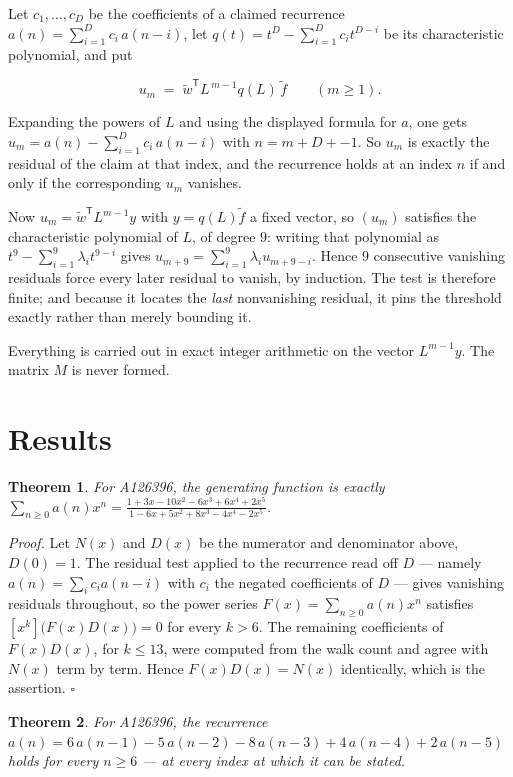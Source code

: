 \documentclass[11pt]{article}
\newtheorem{theorem}{Theorem}
\theoremstyle{definition}
\begin{document}
Let $c_1,\dots,c_D$ be the coefficients of a claimed recurrence $a(n) = \sum_{i=1}^{D} c_i\,a(n-i)$, let $q(t) = t^{D} - \sum_{i=1}^{D} c_i t^{D-i}$ be its characteristic polynomial, and put

\[u_m \;=\; \tilde w^{\mathsf T} L^{\,m-1} q(L)\,\tilde f \qquad (m \ge 1).\]

Expanding the powers of $L$ and using the displayed formula for $a$, one gets $u_m = a(n) - \sum_{i=1}^{D} c_i\,a(n-i)$ with $n = m + D + -1$. So $u_m$ is exactly the residual of the claim at that index, and the recurrence holds at an index $n$ if and only if the corresponding $u_m$ vanishes.

Now $u_m = \tilde w^{\mathsf T} L^{m-1} y$ with $y = q(L)\tilde f$ a fixed vector, so $(u_m)$ satisfies the characteristic polynomial of $L$, of degree $9$: writing that polynomial as $t^{9} - \sum_{i=1}^{9} \lambda_i t^{9-i}$ gives $u_{m+9} = \sum_{i=1}^{9} \lambda_i u_{m+9-i}$. Hence $9$ consecutive vanishing residuals force every later residual to vanish, by induction. The test is therefore finite; and because it locates the {\itshape last} nonvanishing residual, it pins the threshold exactly rather than merely bounding it.

Everything is carried out in exact integer arithmetic on the vector $L^{m-1}y$. The matrix $M$ is never formed.

\section{Results}

\begin{theorem} For A126396, the generating function is exactly $\sum_{n\ge 0} a(n)x^n = \frac{1 + 3x - 10x^{2} - 6x^{3} + 6x^{4} + 2x^{5}}{1 - 6x + 5x^{2} + 8x^{3} - 4x^{4} - 2x^{5}}$.\end{theorem}

{\itshape Proof.} Let $N(x)$ and $D(x)$ be the numerator and denominator above, $D(0)=1$. The residual test applied to the recurrence read off $D$ --- namely $a(n) = \sum_i c_i a(n-i)$ with $c_i$ the negated coefficients of $D$ --- gives vanishing residuals throughout, so the power series $F(x)=\sum_{n\ge 0}a(n)x^n$ satisfies $[x^k]\bigl(F(x)D(x)\bigr) = 0$ for every $k > 6$. The remaining coefficients of $F(x)D(x)$, for $k \le 13$, were computed from the walk count and agree with $N(x)$ term by term. Hence $F(x)D(x) = N(x)$ identically, which is the assertion. $\square$

\begin{theorem} For A126396, the recurrence $a(n) = 6\,a(n-1) - 5\,a(n-2) - 8\,a(n-3) + 4\,a(n-4) + 2\,a(n-5)$ holds for every $n \ge 6$ --- at every index at which it can be stated.\end{theorem}
\end{document}
